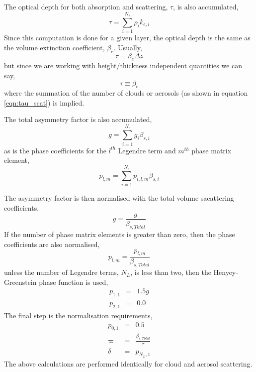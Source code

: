 The optical depth for both absorption and scattering, $\tau$, is also accumulated,
\begin{equation}
  \tau = \sum_{i=1}^{N_s}\rho_{i}  k_{e,i}
  \label{eqn:tau_scat}
\end{equation}
Since this computation is done for a given layer, the optical depth is the same as the volume extinction coefficient, $\beta_e$. Usually,
\begin{equation}
  \tau = \beta_e \Delta z
\end{equation}
but since we are working with height/thickness independent quantities we can say,
\begin{equation}
  \tau \equiv \beta_e
  \label{eqn:equiv_tau}
\end{equation}
where the summation of the number of clouds or aerosols (as shown in equation \ref{eqn:tau_scat}) is implied.

The total asymmetry factor is also accumulated,
\begin{equation}
  g = \sum_{i=1}^{N_c}g_i \beta_{s,i}
\end{equation}
as is the phase coefficients for the $l^{th}$ Legendre term and $m^{th}$ phase matrix element,
\begin{equation}
  p_{l,m} = \sum_{i=1}^{N_c}p_{i,l,m} \beta_{s,i}
\end{equation}

The asymmetry factor is then normalised with the total volume sacattering coefficients, 
\begin{equation}
  g = \frac{g}{\beta_{s,Total}}
\end{equation}
If the number of phase matrix elements is greater than zero, then the phase coefficients are also normalised,
\begin{equation}
  p_{l,m} = \frac{p_{l,m}}{\beta_{s,Total}}
\end{equation}
unless the number of Legendre terms, $N_L$, is less than two, then the Henyey-Greenstein phase function is used,
\begin{eqnarray}
  p_{1,1} &=& 1.5g\\
  p_{2,1} &=& 0.0
\end{eqnarray}
The final step is the normalisation requirements,
\begin{eqnarray}
  p_{0,1} &=& 0.5\\
  \varpi  &=& \frac{\beta_{s,Total}}{\tau}\\
  \delta  &=& p_{N_L,1}
\end{eqnarray}
The above calculations are performed identically for cloud and aerosol scattering.


